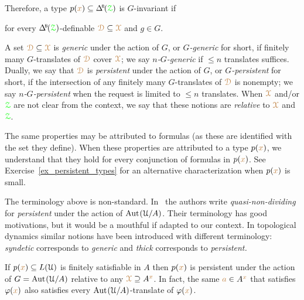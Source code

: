 Therefore, a type $p({\mr x})\subseteq\BDelta(\grZ)$ is $G$-invariant if

\hfill for every $\BDelta({\grZ})$-definable ${\color{brown}\EuScript D}\subseteq{\color{brown}\EuScript X}$ and $g\in G$.


A set ${\color{brown}\EuScript D}\subseteq{\color{brown}\EuScript X}$ is \emph{generic\/} under the action of $G$, or \emph{$G$-generic\/} for short, if finitely many $G$-translates of ${\color{brown}\EuScript D}$ cover ${\color{brown}\EuScript X}$; we say \emph{$n$-$G$-generic\/} if $\le n$ translates suffices.
Dually, we say that ${\color{brown}\EuScript D}$ is \emph{persistent\/} under the action of $G$, or \emph{$G$-persistent\/} for short, if the intersection of any finitely many $G$-translates of ${\color{brown}\EuScript D}$ is nonempty; we say \emph{$n$-$G$-persistent\/} when the request is limited to $\le n$ translates.
When ${\color{brown}\EuScript X}$ and/or ${\color{green}\EuScript Z}$ are not clear from the context, we say that these notions are \emph{relative\/} to ${\color{brown}\EuScript X}$ and ${\color{green}\EuScript Z}$.

The same properties may be attributed to formulas (as these are identified with the set they define).
When these properties are attributed to a type $p({\color{brown} x})$, we understand that they hold for every conjunction of formulas in $p({\color{brown} x})$.
See Exercise~\ref{ex_persistent_types} for an alternative characterization when $p({\color{brown} x})$ is small.

\noindent\llap{\textcolor{red}{\Large\warning}\kern1.5ex}\ignorespaces
The terminology above is non-standard.
In~\cite{CK} the authors write \textit{quasi-non-dividing\/} for \textit{persistent\/} under the action of ${\rm Aut\kern.15ex}(\EuScript U/A)$.
Their terminology has good motivations, but it would be a mouthful if adapted to our context.
In topological dynamics similar notions have been introduced with different terminology: \textit{syndetic\/} corresponds to \textit{generic\/} and \textit{thick\/} corresponds to \textit{persistent.}

\begin{example}
  If $p({\color{brown} x})\subseteq L(\EuScript U)$ is finitely satisfiable in $A$ then $p({\color{brown} x})$ is persistent under the action of $G={\rm Aut\kern.15ex}(\EuScript U/A)$ relative to any ${\color{brown}\EuScript X}\supseteq A^{\color{brown} x}$.
  In fact, the same ${\color{brown} a}\in A^{\color{brown} x}$ that satisfies $\varphi({\color{brown} x})$ also satisfies every ${\rm Aut\kern.15ex}(\EuScript U/A)$-translate of $\varphi({\color{brown} x})$.
\end{example}

